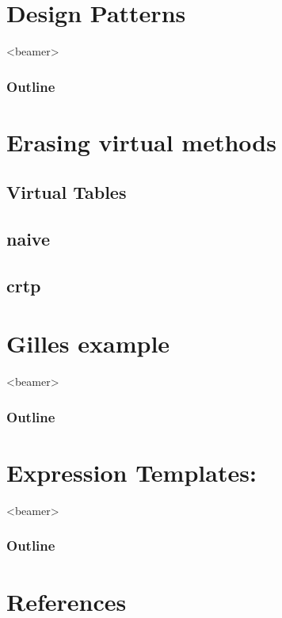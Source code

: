 \documentclass[notes=hide,xcolor=svgnames,professionalfonts,lualatex]{beamer}
\begin{document}
\section{Design Patterns}
\begin{frame}<beamer>                                                                                                                    
    \frametitle{Outline}
    \tableofcontents[currentsection]
\end{frame}


\section{Erasing virtual methods}
\subsection{Virtual Tables}

\subsection{naive}

\subsection{crtp}


\section{Gilles example}
\begin{frame}<beamer>                                                                                                                    
    \frametitle{Outline}
    \tableofcontents[currentsection]
\end{frame}


\section{Expression Templates:}
\begin{frame}<beamer>                                                                                                                    
    \frametitle{Outline}
    \tableofcontents[currentsection]
\end{frame}


\section{References}

\end{document}
